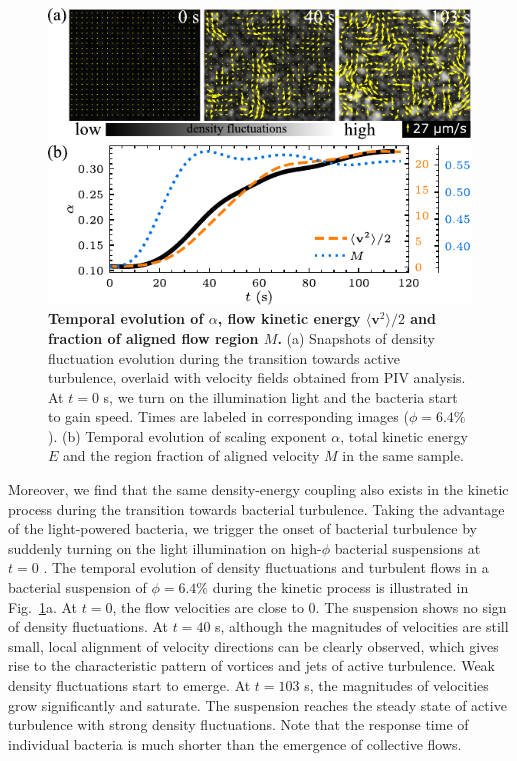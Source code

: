 \begin{figure}[!ht]
\begin{center}
\includegraphics[width=4.5in]{figs/5-GNF/7.pdf}
\caption[Temporal Evolution of $\alpha$, Flow Kinetic Energy $\langle \bm{v}^2 \rangle/2$ and Fraction of Aligned Flow Region $M$]
{
\textbf{Temporal evolution of $\alpha$, flow kinetic energy $\langle \bm{v}^2 \rangle/2$ and fraction of aligned flow region $M$.}
(a) Snapshots of density fluctuation evolution during the transition towards active turbulence, overlaid with velocity fields obtained from PIV analysis. At $t=0$ s, we turn on the illumination light and the bacteria start to gain speed. Times are labeled in corresponding images ($\phi=6.4\%$).
(b) Temporal evolution of scaling exponent $\alpha$, total kinetic energy $E$ and the region fraction of aligned velocity $M$ in the same sample.
}
\label{fig:alpha-kinetics}
\end{center}
\end{figure}


Moreover, we find that the same density-energy coupling also exists in the kinetic process during the transition towards bacterial turbulence. Taking the advantage of the light-powered bacteria, we trigger the onset of bacterial turbulence by suddenly turning on the light illumination on high-$\phi$ bacterial suspensions at $t=0$ \cite{Peng2020}.
The temporal evolution of density fluctuations and turbulent flows in a bacterial suspension of $\phi = 6.4\%$ during the kinetic process is illustrated in Fig.~\ref{fig:alpha-kinetics}a. At $t=0$, the flow velocities are close to 0. The suspension shows no sign of density fluctuations. At $t=40$ s, although the magnitudes of velocities are still small, local alignment of velocity directions can be clearly observed, which gives rise to the characteristic pattern of vortices and jets of active turbulence. Weak density fluctuations start to emerge. At $t=103$ s, the magnitudes of velocities grow significantly and saturate. The suspension reaches the steady state of active turbulence with strong density fluctuations. Note that the response time of individual bacteria is much shorter than the emergence of collective flows.


